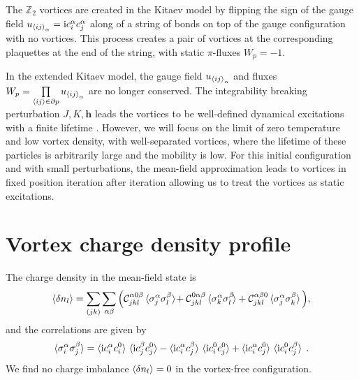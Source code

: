
The $\mathbb{Z}_2$ vortices are created in the Kitaev model by flipping the sign of the gauge field $u_{\braket{ij}_\alpha}=\mathrm{i} c_i^\alpha c_j^\alpha$ along of a string of bonds on top of the gauge configuration with no vortices. This process creates a pair of vortices at the corresponding plaquettes at the end of the string, with static $\pi$-fluxes $W_p=-1$.

In the extended Kitaev model, the gauge field $u_{\braket{ij}_\alpha}$ and fluxes $W_p=\prod\limits_{\braket{ij}\in\partial p} u_{\braket{ij}_\alpha}$ are no longer conserved. The integrability breaking perturbation $J,K,\mathbf{h}$ leads the vortices to be well-defined dynamical excitations with a finite lifetime  \cite{Zhang2021,Joy_2022}.
However, we will focus on the limit of zero temperature and low vortex density, with well-separated vortices, where the lifetime of these particles is arbitrarily large and the mobility is low.  For this initial configuration and with small perturbations, the mean-field approximation leads to vortices in fixed position iteration after iteration allowing us to treat the vortices as static excitations.


\section{Vortex charge density profile}



The charge density in the mean-field state is
\begin{equation}
\braket{\delta n_{l}}  = \sum_{(jk)}
\sum_{\alpha\beta} \Big(  \mathcal{C}_{jkl}^{\alpha 0 \beta } \braket{\sigma_j^\alpha \sigma_l^\beta} \!+\mathcal{C}_{jkl}^{ 0 \alpha\beta } \braket{\sigma_k^\alpha \sigma_l^\beta\!} +
\mathcal{C}_{jkl}^{   \alpha\beta 0 } \braket{\sigma_j^\alpha \sigma_k^\beta}\Big), \label{eq:Z2-ch}
\end{equation}
and the correlations are given by
\begin{equation}
    \braket{\sigma_i^\alpha\sigma_j^\beta} = \braket{\mathrm{i} c_i^\alpha c_i^0 } \, \braket{ \mathrm{i} c_j^\beta c_j^0} - \braket{\mathrm{i} c_i^\alpha  c_j^\beta} \, \braket{\mathrm{i} c_i^0 c_j^0} + \braket{\mathrm{i} c_i^\alpha c_j^0 } \, \braket{ \mathrm{i} c_i^0  c_j^\beta} \; .
\end{equation}
We find no charge imbalance $\braket{\delta n_{l}} = 0$ in the vortex-free configuration.

